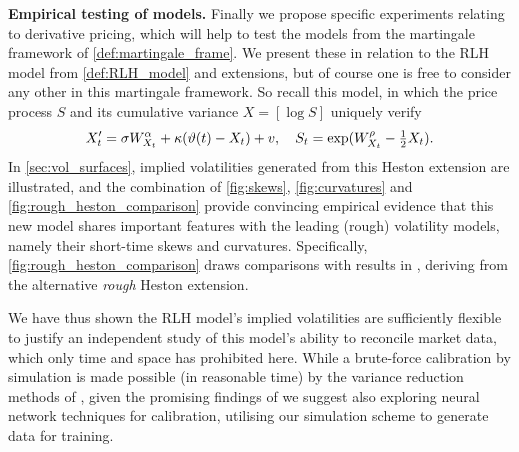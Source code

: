 \vspace{3mm}\textbf{Empirical testing of models.} Finally we propose specific experiments relating to derivative pricing, which will help to test the models from the martingale framework of \autoref{def:martingale_frame}. We present these in relation to the RLH model from \autoref{def:RLH_model} and extensions, but of course one is free to consider any other in this martingale framework. So recall this model, in which the price process $S$ and its cumulative variance $X = [\log S]$ uniquely verify
\begin{equation}\label{eq:conc_rlh_summary}
    X'_t = \sigma W^\alpha_{X_t} + \kappa(\vartheta(t) - X_t) + v,\quad S_t=\exp(W^\rho_{X_t}-\tfrac12 X_t).
\end{equation}
In \autoref{sec:vol_surfaces}, implied volatilities generated from this Heston extension are illustrated, and the combination of \autoref{fig:skews}, \autoref{fig:curvatures} and \autoref{fig:rough_heston_comparison} provide convincing empirical evidence that this new model shares important features with the leading (rough) volatility models, namely their short-time skews and curvatures. Specifically, \autoref{fig:rough_heston_comparison} draws comparisons with results in \cite{eleuch_2019b}, deriving from the alternative \emph{rough} Heston extension.

We have thus shown the RLH model's implied volatilities are sufficiently flexible to justify an independent study of this model's ability to reconcile market data, which only time and space has prohibited here. While a brute-force calibration by simulation is made possible (in reasonable time) by the variance reduction methods of \cite{mccrickerd_2018}, given the promising findings of \cite{horvath_2021} we suggest also exploring neural network techniques for calibration, utilising our simulation scheme to generate data for training.

